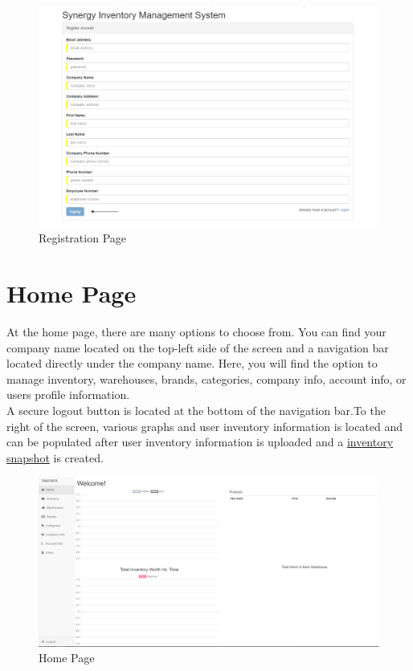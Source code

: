 \documentclass[12pt, titlepage]{article}
\begin{document}
\begin{figure}[h]
\centering
\includegraphics[width=\linewidth]{sims2.PNG}
\caption{Registration Page}
\label{fig:figure2}
\end{figure}

\section{Home Page}
At the home page, there are many options to choose from. You can find your company name located on the top-left side of the screen and a navigation bar located directly under the company name. Here, you will find the option to manage inventory, warehouses, brands, categories, company info, account info, or users profile information.\\

A secure logout button is located at the bottom of the navigation bar.To the right of the screen, various graphs and user inventory information is located and can be populated after user inventory information is uploaded and a \hyperref[sec:snapshot]{inventory snapshot} is created.
\begin{figure}[h]
\centering
\includegraphics[width=\linewidth]{sims3.PNG}
\caption{Home Page}
\label{fig:figure3}
\end{figure}
\end{document}
